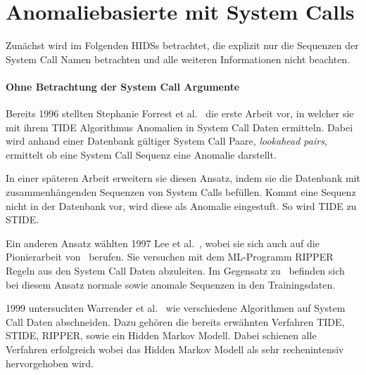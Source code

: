     \section{Anomaliebasierte  mit System Calls}

        Zunächst wird im Folgenden \acp{HIDS} betrachtet, die explizit nur die Sequenzen der System Call Namen betrachten und alle weiteren Informationen nicht beachten.

        \paragraph{Ohne Betrachtung der System Call Argumente}\label{sec:related_no_arg}
                Bereits 1996 stellten Stephanie Forrest et al.~\cite{FORREST} die erste Arbeit vor, in welcher sie mit ihrem \ac{TIDE} Algorithmus Anomalien in System Call Daten ermitteln.
                Dabei wird anhand einer Datenbank gültiger System Call Paare, \textit{lookahead pairs}, ermittelt ob eine System Call Sequenz eine Anomalie darstellt.\par\medskip

                In einer späteren Arbeit erweitern sie diesen Ansatz, indem sie die Datenbank mit zusammenhängenden Sequenzen von System Calls befüllen.
                Kommt eine Sequenz nicht in der Datenbank vor, wird diese als Anomalie eingestuft.
                So wird \ac{TIDE} zu \ac{STIDE}.~\cite{STIDE}\par\medskip

                Ein anderen Ansatz wählten 1997 Lee et al.~\cite{LEE1997}, wobei sie sich auch auf die Pionierarbeit von~\cite{FORREST} berufen.
                Sie versuchen mit dem \ac{ML}-Programm RIPPER Regeln aus den System Call Daten abzuleiten.
                Im Gegensatz zu~\cite{FORREST} befinden sich bei diesem Ansatz normale sowie anomale Sequenzen in den Trainingsdaten.\par\medskip

                1999 untersuchten Warrender et al.~\cite{STIDE_Alternatives} wie verschiedene Algorithmen auf System Call Daten abschneiden.
                Dazu gehören die bereits erwähnten Verfahren \ac{TIDE}, \ac{STIDE}, RIPPER, sowie ein Hidden Markov Modell.
                Dabei schienen alle Verfahren erfolgreich wobei das Hidden Markov Modell als sehr rechenintensiv hervorgehoben wird.\par\medskip
         
